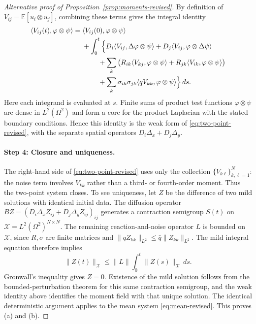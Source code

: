 \begin{proof}[Alternative proof of Proposition~\ref{prop:moments-revised}]
By definition of $V_{ij}=\mathbb E[u_i\otimes u_j]$, combining these
terms gives the integral identity
\begin{align*}
\langle V_{ij}(t),\varphi\otimes\psi\rangle
={}&\langle V_{ij}(0),\varphi\otimes\psi\rangle\\
&+\int_0^t\Big\{
  D_i\langle V_{ij},\Delta\varphi\otimes\psi\rangle
 +D_j\langle V_{ij},\varphi\otimes\Delta\psi\rangle\\
&\hspace{2.3em}+\sum_k\big(
  R_{ik}\langle V_{kj},\varphi\otimes\psi\rangle
 +R_{jk}\langle V_{ik},\varphi\otimes\psi\rangle\big)\\
&\hspace{2.3em}+\sum_k\sigma_{ik}\sigma_{jk}
   \langle qV_{kk},\varphi\otimes\psi\rangle\Big\}\,ds.
\end{align*}
Here each integrand is evaluated at $s$.
Finite sums of product test functions $\varphi\otimes\psi$ are dense
in $L^2(\Omega^2)$ and form a core for the product Laplacian
with the stated boundary conditions. Hence this identity is the weak
form of \eqref{eq:two-point-revised}, with the separate spatial operators
$D_i\Delta_x+D_j\Delta_y$.

\paragraph{Step 4: Closure and uniqueness.}
The right-hand side of \eqref{eq:two-point-revised} uses only the collection
$\{V_{k\ell}\}_{k,\ell=1}^N$: the noise term involves $V_{kk}$ rather
than a third- or fourth-order moment. Thus the two-point system closes.
To see uniqueness, let $Z$ be the difference of two mild solutions
with identical initial data. The diffusion operator
$B Z=(D_i\Delta_x Z_{ij}+D_j\Delta_y Z_{ij})_{ij}$
generates a contraction semigroup $S(t)$ on
$\mathcal X=L^2(\Omega^2)^{N\times N}$.
The remaining reaction-and-noise operator $L$ is bounded on
$\mathcal X$, since $R,\sigma$ are finite matrices and
$\|qZ_{kk}\|_{L^2}\leq\bar q\|Z_{kk}\|_{L^2}$.
The mild integral equation therefore implies
\[
\|Z(t)\|_{\mathcal X}
\leq\|L\|\int_0^t\|Z(s)\|_{\mathcal X}\,ds.
\]
Gronwall's inequality gives $Z=0$. Existence of the mild solution
follows from the bounded-perturbation theorem for this same
contraction semigroup, and the weak identity above identifies the
moment field with that unique solution. The identical deterministic
argument applies to the mean system \eqref{eq:mean-revised}. This proves (a) and (b).
\end{proof}

